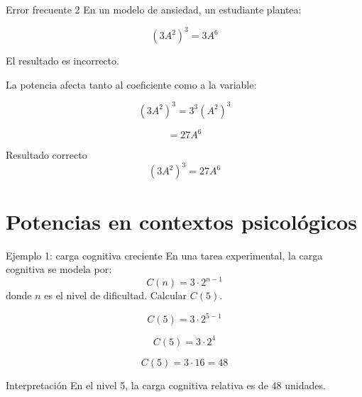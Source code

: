\documentclass[handout,aspectratio=169]{beamer}
\begin{document}
	\begin{frame}{Error frecuente 2}
		En un modelo de ansiedad, un estudiante plantea:
		
		\[
		(3A^2)^3=3A^6
		\]
		
		\pause
		
		\begin{alerta}
			El resultado es incorrecto.
		\end{alerta}
		
		\pause
		
		La potencia afecta tanto al coeficiente como a la variable:
		
		\[
		(3A^2)^3=3^3(A^2)^3
		\]
		
		\[
		=27A^6
		\]
		
		\pause
		
		\begin{block}{Resultado correcto}
			\[
			(3A^2)^3=27A^6
			\]
		\end{block}
	\end{frame}
	
	\section{Potencias en contextos psicológicos}
	
	\begin{frame}{Ejemplo 1: carga cognitiva creciente}
		En una tarea experimental, la carga cognitiva se modela por:
		\[
		C(n)=3\cdot 2^{n-1}
		\]
		donde \(n\) es el nivel de dificultad. Calcular $C(5)$.
		
		\[
		C(5)=3\cdot 2^{5-1}
		\]
		
		\[
		C(5)=3\cdot 2^4
		\]
		
		\[
		C(5)=3\cdot 16=48
		\]
		
		\begin{block}{Interpretación}
			En el nivel 5, la carga cognitiva relativa es de \(48\) unidades.
		\end{block}
	\end{frame}
	
\end{document}
